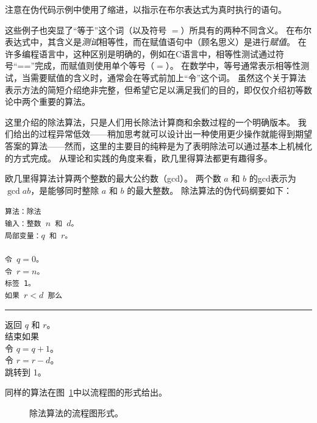 注意在伪代码示例中使用了缩进，以指示在布尔表达式为真时执行的语句。

这些例子也突显了“等于”这个词（以及符号 $=$）所具有的两种不同含义。
在布尔表达式中，其含义是{\em 测试}相等性，而在赋值语句中（顾名思义）是进行{\em 赋值}。
在许多编程语言中，这种区别是明确的，例如在C语言中，相等性测试通过符号“==”完成，而赋值则使用单个等号（$=$）。
在数学中，等号通常表示相等性测试，当需要赋值的含义时，通常会在等式前加上“令”这个词。
虽然这个关于算法表示方法的简短介绍绝非完整，但希望它足以满足我们的目的，即仅仅介绍初等数论中两个重要的算法。

这里介绍的除法算法，只是人们用长除法计算商和余数过程的一个明确版本。
我们给出的过程异常低效——稍加思考就可以设计出一种使用更少操作就能得到期望答案的算法——然而，这里的主要目的纯粹是为了表明除法可以通过基本上机械化的方式完成。
从理论和实践的角度来看，欧几里得算法都更有趣得多。

欧几里得算法计算两个整数的最大公约数（gcd）。
两个数 $a$ 和 $b$ 的gcd表示为 $\gcd{a}{b}$，是能够同时整除 $a$ 和 $b$ 的最大整数。
除法算法的伪代码纲要如下：
\medskip

\begin{center}
  \begin{minipage}[b]{.5\textwidth}
    \tt 算法：除法\\
    输入：整数 $n$ 和 $d$。\\
    局部变量：$q$ 和 $r$。\\
    \\
    令 $q = 0$。\\
    令 $r = n$。\\
    标签 1。\\
    如果 $r < d$ 那么\\
    \rule{15pt}{0pt} 返回 $q$ 和 $r$。\\
    结束如果\\
    令 $q = q + 1$。\\
    令 $r = r - d$。\\
    跳转到 1。\\
  \end{minipage}
\end{center}

同样的算法在图~\ref{fig:div_alg}中以流程图的形式给出。

\begin{figure}[!hbt]
  \begin{center}
    
  \end{center}
  \caption{除法算法的流程图形式。}
  \label{fig:div_alg}
\end{figure}

